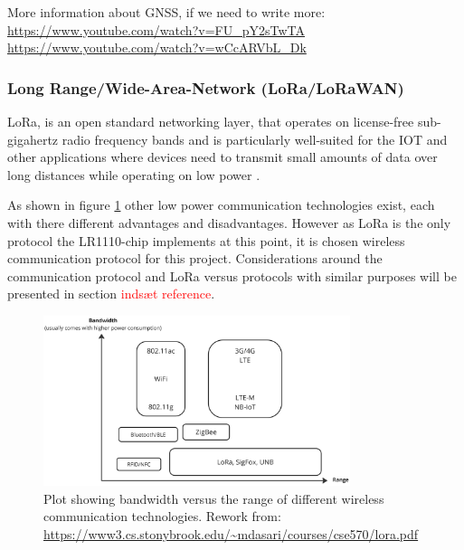 More information about GNSS, if we need to write more:
\url{https://www.youtube.com/watch?v=FU_pY2sTwTA}
\url{https://www.youtube.com/watch?v=wCcARVbL_Dk}


\subsubsection{Long Range/Wide-Area-Network (LoRa/LoRaWAN)}
\ac{LoRa}, is an open standard networking layer, that operates on license-free sub-gigahertz radio frequency bands and is particularly well-suited for the \ac{IOT} and other applications where devices need to transmit small amounts of data over long distances while operating on low power \cite{LoRaWAN_1_0}.

As shown in figure \ref{fig:LoRa_bandwidth_range} other low power communication technologies exist, each with there different advantages and disadvantages. However as \ac{LoRa} is the only protocol the LR1110-chip implements at this point, it is chosen wireless communication protocol for this project.
Considerations around the communication protocol and \ac{LoRa} versus protocols with similar purposes will be presented in section \textcolor{red}{indsæt reference}.

\begin{figure}[H]
    \centering
    \includegraphics[width=0.8\textwidth]{figures/range_bandwidth.png}
    \caption{Plot showing bandwidth versus the range of different wireless communication technologies. Rework from: \url{https://www3.cs.stonybrook.edu/~mdasari/courses/cse570/lora.pdf}}
    \label{fig:LoRa_bandwidth_range}
\end{figure}

